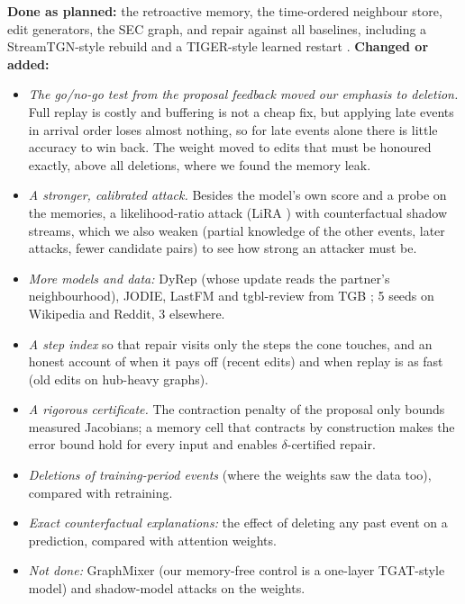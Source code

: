 \documentclass{article}
\begin{document}
\textbf{Done as planned:} the retroactive memory, the time-ordered neighbour store, edit generators, the SEC graph, and
repair against all baselines, including a StreamTGN-style rebuild \citep{zhang2026streamtgn} and a TIGER-style learned
restart \citep{zhang2023tiger}. \textbf{Changed or added:}
\begin{itemize}
\item \emph{The go/no-go test from the proposal feedback moved our emphasis to deletion.} Full replay is costly and
  buffering is not a cheap fix, but applying late events in arrival order loses almost nothing, so for late events alone
  there is little accuracy to win back. The weight moved to edits that must be honoured exactly, above all deletions,
  where we found the memory leak.
\item \emph{A stronger, calibrated attack.} Besides the model's own score and a probe on the memories, a likelihood-ratio
  attack (LiRA \citep{carlini2022lira}) with counterfactual shadow streams, which we also weaken (partial knowledge of the
  other events, later attacks, fewer candidate pairs) to see how strong an attacker must be.
\item \emph{More models and data:} DyRep (whose update reads the partner's neighbourhood), JODIE, LastFM and tgbl-review
  from TGB \citep{huang2023tgb}; 5 seeds on Wikipedia and Reddit, 3 elsewhere.
\item \emph{A step index} so that repair visits only the steps the cone touches, and an honest account of when it pays
  off (recent edits) and when replay is as fast (old edits on hub-heavy graphs).
\item \emph{A rigorous certificate.} The contraction penalty of the proposal only bounds measured Jacobians; a memory cell
  that contracts by construction makes the error bound hold for every input and enables $\delta$-certified repair.
\item \emph{Deletions of training-period events} (where the weights saw the data too), compared with retraining.
\item \emph{Exact counterfactual explanations:} the effect of deleting any past event on a prediction, compared with
  attention weights.
\item \emph{Not done:} GraphMixer (our memory-free control is a one-layer TGAT-style model) and shadow-model attacks on the
  weights.
\end{itemize}

\end{document}

